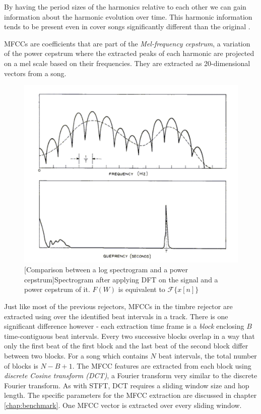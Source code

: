 By having the period sizes of the harmonics relative to each other we can
gain information about the harmonic evolution over time. This harmonic
information tends to be present even in cover songs significantly different than
the original \cite{tralie2015cover}.

MFCCs are coefficients that are part of the \textit{Mel-frequency
cepstrum}, a variation of the power cepstrum where the extracted peaks of
each harmonic are projected on a mel scale based on their frequencies. They are
extracted as 20-dimensional vectors from a song.

\begin{figure}[H]
    \includegraphics[width=\textwidth]{Algorithms/powercepstrum2.png}
    [Comparison between a log spectrogram and a power cepstrum]{Spectrogram after applying DFT on the signal and  a power cepstrum of it. $F(W)$ is equivalent to $\mathcal{F}\{x[n]\}$ \cite{noll1967cepstrum}}
    \label{fig:powercepstrum}
\end{figure}

Just like most of the previous rejectors, MFCCs in the timbre rejector are
extracted using over the identified beat intervals in a track. There is one
significant difference however - each extraction time frame is a \textit{block}
enclosing $B$ time-contiguous beat intervals. Every two successive blocks
overlap in a way that only the first beat of the first block and the last beat
of the second block differ between two blocks. For a song which contains $N$
beat intervals, the total number of blocks is $N - B + 1$. The MFCC features are
extracted from each block using \textit{discrete Cosine transform (DCT)}, a
Fourier transform very similar to the discrete Fourier transform. As with STFT,
DCT requires a sliding window size and hop length. The specific parameters for
the MFCC extraction are discussed in chapter \ref{chap:benchmark}. One MFCC
vector is extracted over every sliding window.

